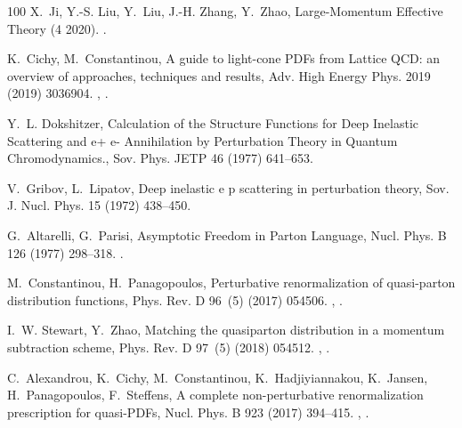 \begin{thebibliography}{100}
X.~Ji, Y.-S. Liu, Y.~Liu, J.-H. Zhang, Y.~Zhao, {Large-Momentum Effective
  Theory} (4 2020).
\newblock \href {http://arxiv.org/abs/2004.03543} {}.

K.~Cichy, M.~Constantinou, {A guide to light-cone PDFs from Lattice QCD: an
  overview of approaches, techniques and results}, Adv. High Energy Phys. 2019
  (2019) 3036904.
\newblock \href {http://arxiv.org/abs/1811.07248} {},
  \href {https://doi.org/10.1155/2019/3036904}
  {}.

Y.~L. Dokshitzer, {Calculation of the Structure Functions for Deep Inelastic
  Scattering and e+ e- Annihilation by Perturbation Theory in Quantum
  Chromodynamics.}, Sov. Phys. JETP 46 (1977) 641--653.

V.~Gribov, L.~Lipatov, {Deep inelastic e p scattering in perturbation theory},
  Sov. J. Nucl. Phys. 15 (1972) 438--450.

G.~Altarelli, G.~Parisi, {Asymptotic Freedom in Parton Language}, Nucl. Phys. B
  126 (1977) 298--318.
\newblock \href {https://doi.org/10.1016/0550-3213(77)90384-4}
  {}.

M.~Constantinou, H.~Panagopoulos, {Perturbative renormalization of quasi-parton
  distribution functions}, Phys. Rev. D 96~(5) (2017) 054506.
\newblock \href {http://arxiv.org/abs/1705.11193} {},
  \href {https://doi.org/10.1103/PhysRevD.96.054506}
  {}.

I.~W. Stewart, Y.~Zhao, {Matching the quasiparton distribution in a momentum
  subtraction scheme}, Phys. Rev. D 97~(5) (2018) 054512.
\newblock \href {http://arxiv.org/abs/1709.04933} {},
  \href {https://doi.org/10.1103/PhysRevD.97.054512}
  {}.

C.~Alexandrou, K.~Cichy, M.~Constantinou, K.~Hadjiyiannakou, K.~Jansen,
  H.~Panagopoulos, F.~Steffens, {A complete non-perturbative renormalization
  prescription for quasi-PDFs}, Nucl. Phys. B 923 (2017) 394--415.
\newblock \href {http://arxiv.org/abs/1706.00265} {},
  \href {https://doi.org/10.1016/j.nuclphysb.2017.08.012}
  {}.


\end{thebibliography}

